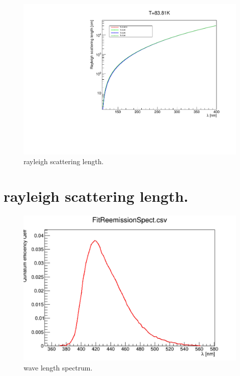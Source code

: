 \documentclass[a4paper]{jpconf}
\begin{document}
  \begin{figure}[ht]
    \begin{center}
      \includegraphics[width=35.5pc]{rayleigh.pdf}
    \end{center}
    \caption{\label{fig:rayleigh}rayleigh scattering length.}
  \end{figure}
  
\section{rayleigh scattering length.}
\cite{ref:wls}

\begin{figure}[ht]
\begin{center}
\includegraphics[width=35.5pc]{wls.pdf}
\end{center}
\caption{\label{fig:wls}wave length spectrum.}
\end{figure}
\end{document}
